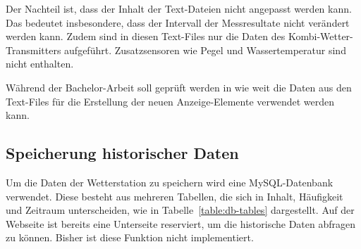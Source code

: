 \noindent
Der Nachteil ist, dass der Inhalt der Text-Dateien nicht angepasst werden kann. Das bedeutet insbesondere, dass der Intervall der Messresultate nicht verändert werden kann. Zudem sind in diesen Text-Files nur die Daten des Kombi-Wetter-Transmitters aufgeführt. Zusatzsensoren wie Pegel und Wassertemperatur sind nicht enthalten.
\newline

\noindent
Während der Bachelor-Arbeit soll geprüft werden in wie weit die Daten aus den Text-Files für die Erstellung der neuen Anzeige-Elemente verwendet werden kann. 


%
%
%

\subsection{Speicherung historischer Daten}
Um die Daten der Wetterstation zu speichern wird eine MySQL-Datenbank verwendet. Diese besteht aus mehreren Tabellen, die sich in Inhalt, Häufigkeit und Zeitraum unterscheiden, wie in Tabelle~\ref{table:db-tables} dargestellt. Auf der Webseite ist bereits eine Unterseite reserviert, um die historische Daten abfragen zu können. Bisher ist diese Funktion nicht implementiert.

